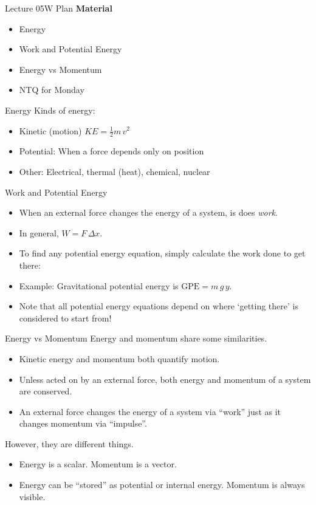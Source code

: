 \documentclass[english]{beamer}
\begin{document}
\begin{frame}{Lecture 05W Plan}
  \textbf{Material}
  \begin{itemize}
    \item Energy
    \item Work and Potential Energy
    \item Energy vs Momentum
    \item NTQ for Monday
  \end{itemize}
\end{frame}

\begin{frame}{Energy}
  Kinds of energy:
  \begin{itemize}
    \item Kinetic (motion) $KE=\frac{1}{2} m\,v^{2}$
    \item Potential: When a force depends only on position
    \item Other: Electrical, thermal (heat), chemical, nuclear
  \end{itemize}
\end{frame}

\begin{frame}{Work and Potential Energy}
  \begin{itemize}
    \item When an external force changes the energy of a system, is does \emph{work}.
    \item In general, $W=F\,\Delta x$.
    \item To find any potential energy equation, simply calculate the work done to get there:
    \item Example: Gravitational potential energy is $\text{GPE} = m\,g\,y$.
    \item Note that all potential energy equations depend on where `getting there' is considered to start from! 
  \end{itemize}
\end{frame}

\begin{frame}{Energy vs Momentum}
  Energy and momentum share some similarities.
  \begin{itemize}
    \item Kinetic energy and momentum both quantify motion.
    \item Unless acted on by an external force, both energy and momentum of a system are conserved.
    \item An external force changes the energy of a system via ``work'' just as it changes momentum via ``impulse''.
  \end{itemize}
  However, they are different things.
  \begin{itemize}
    \item Energy is a scalar. Momentum is a vector.
    \item Energy can be ``stored'' as potential or internal energy. Momentum is always visible.
  \end{itemize}
\end{frame}
\end{document}
